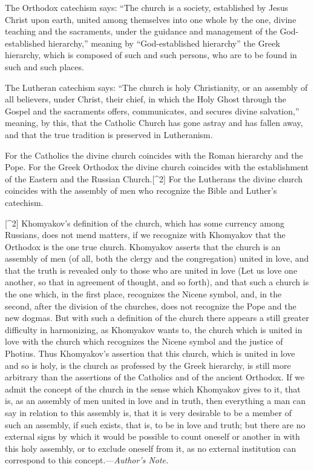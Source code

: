\documentclass{book}
\begin{document}
The Orthodox catechism says: “The church is a society, established by Jesus Christ upon earth, united among themselves into one whole by the one, divine teaching and the sacraments, under the guidance and management of the God-established hierarchy,” meaning by “God-established hierarchy” the Greek hierarchy, which is composed of such and such persons, who are to be found in such and such places.

The Lutheran catechism says: “The church is holy Christianity, or an assembly of all believers, under Christ, their chief, in which the Holy Ghost through the Gospel and the sacraments offers, communicates, and secures divine salvation,” meaning, by this, that the Catholic Church has gone astray and has fallen away, and that the true tradition is preserved in Lutheranism.

For the Catholics the divine church coincides with the Roman hierarchy and the Pope. For the Greek Orthodox the divine church coincides with the establishment of the Eastern and the Russian Church.{[}\textasciicircum{}2{]} For the Lutherans the divine church coincides with the assembly of men who recognize the Bible and Luther’s catechism.

{[}\textasciicircum{}2{]} Khomyakov’s definition of the church, which has some currency among Russians, does not mend matters, if we recognize with Khomyakov that the Orthodox is the one true church. Khomyakov asserts that the church is an assembly of men (of all, both the clergy and the congregation) united in love, and that the truth is revealed only to those who are united in love (Let us love one another, so that in agreement of thought, and so forth), and that such a church is the one which, in the first place, recognizes the Nicene symbol, and, in the second, after the division of the churches, does not recognize the Pope and the new dogmas. But with such a definition of the church there appears a still greater difficulty in harmonizing, as Khomyakov wants to, the church which is united in love with the church which recognizes the Nicene symbol and the justice of Photius. Thus Khomyakov’s assertion that this church, which is united in love and so is holy, is the church as professed by the Greek hierarchy, is still more arbitrary than the assertions of the Catholics and of the ancient Orthodox. If we admit the concept of the church in the sense which Khomyakov gives to it, that is, as an assembly of men united in love and in truth, then everything a man can say in relation to this assembly is, that it is very desirable to be a member of such an assembly, if such exists, that is, to be in love and truth; but there are no external signs by which it would be possible to count oneself or another in with this holy assembly, or to exclude oneself from it, as no external institution can correspond to this concept.—\emph{Author’s Note.}
\end{document}
